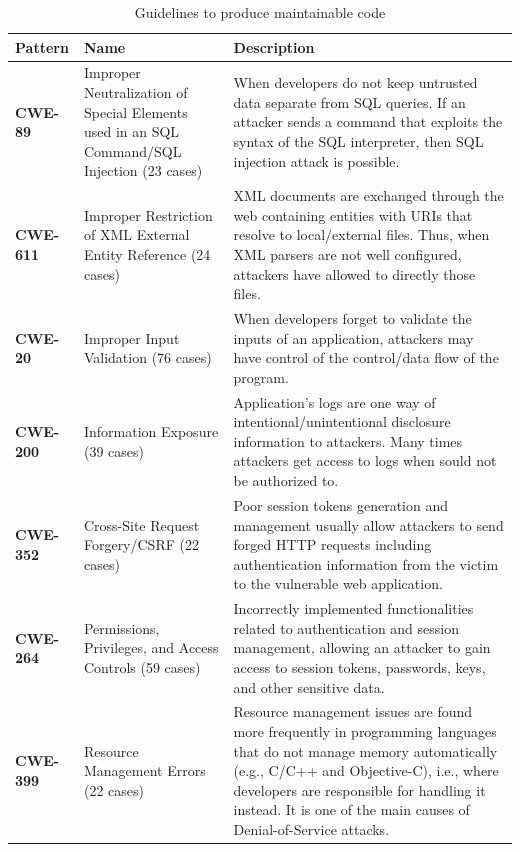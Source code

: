 \documentclass[sigconf,review]{acmart}
\begin{document}
\begin{table}[h]
\footnotesize
	\caption{Guidelines to produce maintainable code}
\begin{tabular}{L{1.1cm}L{2.1cm}L{4.3cm}}

\toprule
\textbf{Pattern} & \textbf{Name} & \textbf{Description}\\
\midrule

\textbf{CWE-89} & 
 Improper Neutralization of Special Elements used in an SQL Command/SQL Injection (23 cases) & 
 When developers do not keep untrusted data
     separate from SQL queries. If an attacker sends a command that
     exploits the syntax of the SQL interpreter, then SQL injection attack is possible.\\\midrule

\textbf{CWE-611} & 
 Improper Restriction of XML External Entity Reference (24 cases) & 
	XML documents are exchanged through the web containing entities with URIs
 	that resolve to local/external files. Thus, when XML parsers are not well configured,
 	attackers have allowed to directly those files.\\\midrule
 
 \textbf{CWE-20} & 
 Improper Input Validation (76 cases) & 
	When developers
 	forget to validate the inputs of an application, attackers may have control
 	of the control/data flow of the program.\\\midrule
 
  \textbf{CWE-200} & 
Information Exposure (39 cases)& 
Application's logs are one way of intentional/unintentional disclosure information
 	to attackers. Many times attackers get access to logs when sould not be authorized to.\\\midrule
 
   \textbf{CWE-352} & 
Cross-Site Request Forgery/CSRF (22 cases)& 
Poor session tokens generation
     and management usually allow attackers to send forged HTTP requests
     including authentication information from the victim to the vulnerable web
     application.\\\midrule
     
       \textbf{CWE-264} & 
Permissions, Privileges, and Access Controls (59 cases)& 
Incorrectly
 	    implemented functionalities related to authentication and session
 	    management, allowing an attacker to gain access to session tokens,
 	    passwords, keys, and other sensitive data.\\\midrule
 	    
 	           \textbf{CWE-399} & 
Resource Management Errors (22 cases)& 
Resource management issues are found more frequently
 		in programming languages that do not manage memory automatically (e.g., C/C++
 	    and Objective-C), i.e., where developers are responsible for
 	    handling it instead. It is one of the main causes of Denial-of-Service attacks.\\\midrule
 	    

\end{tabular}
\end{table}
\end{document}
